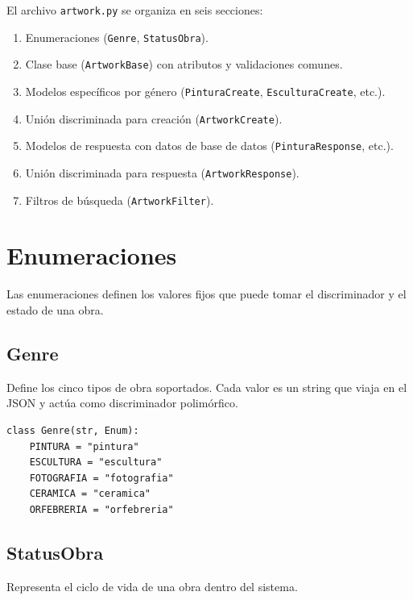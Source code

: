\documentclass[12pt,a4paper]{article}
\begin{document}
El archivo \texttt{artwork.py} se organiza en seis secciones:

\begin{enumerate}
    \item Enumeraciones (\texttt{Genre}, \texttt{StatusObra}).
    \item Clase base (\texttt{ArtworkBase}) con atributos y validaciones comunes.
    \item Modelos específicos por género (\texttt{PinturaCreate}, \texttt{EsculturaCreate}, etc.).
    \item Unión discriminada para creación (\texttt{ArtworkCreate}).
    \item Modelos de respuesta con datos de base de datos (\texttt{PinturaResponse}, etc.).
    \item Unión discriminada para respuesta (\texttt{ArtworkResponse}).
    \item Filtros de búsqueda (\texttt{ArtworkFilter}).
\end{enumerate}

\section{Enumeraciones}

Las enumeraciones definen los valores fijos que puede tomar el discriminador
y el estado de una obra.

\subsection{Genre}

Define los cinco tipos de obra soportados. Cada valor es un string que viaja
en el JSON y actúa como discriminador polimórfico.

\begin{lstlisting}
class Genre(str, Enum):
    PINTURA = "pintura"
    ESCULTURA = "escultura"
    FOTOGRAFIA = "fotografia"
    CERAMICA = "ceramica"
    ORFEBRERIA = "orfebreria"
\end{lstlisting}

\subsection{StatusObra}

Representa el ciclo de vida de una obra dentro del sistema.
\end{document}
